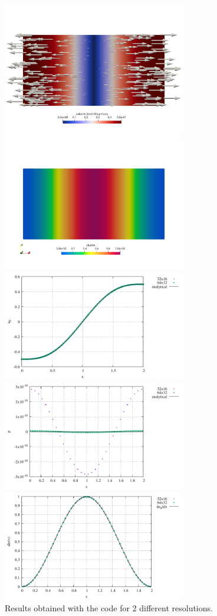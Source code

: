 \begin{center}
\includegraphics[width=8cm]{python_codes/fieldstone_175/results/exp1/ud.png}
\includegraphics[width=8cm]{python_codes/fieldstone_175/results/exp1/duddx.png}\\
\includegraphics[width=8cm]{python_codes/fieldstone_175/results/exp1/ud.pdf}\\
\includegraphics[width=8cm]{python_codes/fieldstone_175/results/exp1/p.pdf}
\includegraphics[width=8cm]{python_codes/fieldstone_175/results/exp1/divv.pdf}\\
{\captionfont Results obtained with the code for 2 different resolutions.}
\end{center}

